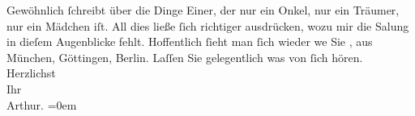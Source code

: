 \begin{ledgroupsized}[t]{13cm}
               Gewöhnlich ſchreibt über die Dinge Einer, der nur ein Onkel, {\pb}nur ein Träumer, nur ein Mädchen iſt. All dies ließe ſich
               richtiger ausdrücken, wozu mir die Sa{\geminationm}lung in dieſem
               Augenblicke fehlt.\pend
           \pstart
           Hoffentlich ſieht man ſich wieder we{\geminationn} Sie \label{K_L01638-2v}\label{K_L01638-2h}, aus München, Göttingen, Berlin. Laſſen Sie
               gelegentlich was von ſich hören.\pend
           \pstart
           Herzlichst{\\[\baselineskip]}Ihr{\\[\baselineskip]}\spacefill\mbox{Arthur.}\pend
           \leftskip=0em{}
         
         \endnumbering{}\end{ledgroupsized}  \newcommand{\dateiname}{L01638}\newcommand{\titel}{Arthur Schnitzler an Hugo von Hofmannsthal, 27. 11. 1906}\newcommand{\editorInnen}{Martin Anton Müller und Gerd-Hermann Susen}
      
